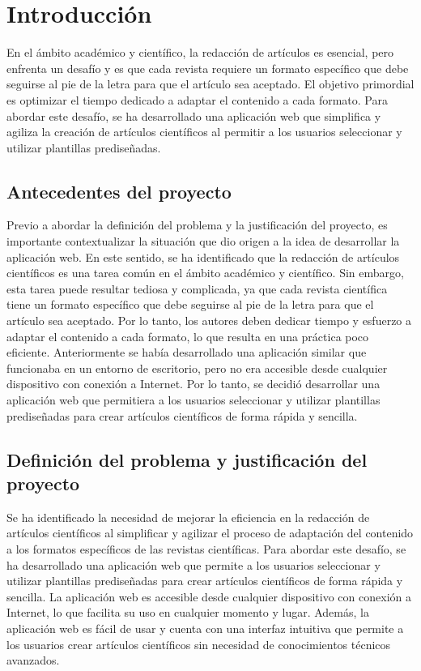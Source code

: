 \section{Introducción}
En el ámbito académico y científico, la redacción de artículos es esencial, pero enfrenta un desafío y es que cada revista requiere un formato específico que debe seguirse al pie de la letra para que el artículo sea aceptado. El objetivo primordial es optimizar el tiempo dedicado a adaptar el contenido a cada formato. Para abordar este desafío, se ha desarrollado una aplicación web que simplifica y agiliza la creación de artículos científicos al permitir a los usuarios seleccionar y utilizar plantillas prediseñadas.

\subsection{Antecedentes del proyecto}
Previo a abordar la definición del problema y la justificación del proyecto, es importante contextualizar la situación que dio origen a la idea de desarrollar la aplicación web. En este sentido, se ha identificado que la redacción de artículos científicos es una tarea común en el ámbito académico y científico. Sin embargo, esta tarea puede resultar tediosa y complicada, ya que cada revista científica tiene un formato específico que debe seguirse al pie de la letra para que el artículo sea aceptado. Por lo tanto, los autores deben dedicar tiempo y esfuerzo a adaptar el contenido a cada formato, lo que resulta en una práctica poco eficiente. Anteriormente se había desarrollado una aplicación similar que funcionaba en un entorno de escritorio, pero no era accesible desde cualquier dispositivo con conexión a Internet. Por lo tanto, se decidió desarrollar una aplicación web que permitiera a los usuarios seleccionar y utilizar plantillas prediseñadas para crear artículos científicos de forma rápida y sencilla.

\subsection{Definición del problema y justificación del proyecto}
Se ha identificado la necesidad de mejorar la eficiencia en la redacción de artículos científicos al simplificar y agilizar el proceso de adaptación del contenido a los formatos específicos de las revistas científicas. Para abordar este desafío, se ha desarrollado una aplicación web que permite a los usuarios seleccionar y utilizar plantillas prediseñadas para crear artículos científicos de forma rápida y sencilla. La aplicación web es accesible desde cualquier dispositivo con conexión a Internet, lo que facilita su uso en cualquier momento y lugar. Además, la aplicación web es fácil de usar y cuenta con una interfaz intuitiva que permite a los usuarios crear artículos científicos sin necesidad de conocimientos técnicos avanzados.


